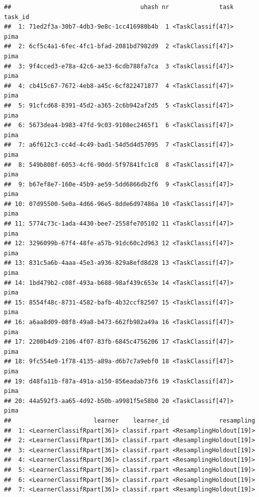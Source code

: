 \documentclass[
]{scrbook}
\newenvironment{Shaded}{\begin{snugshade}}{\end{snugshade}}
\newcommand{\FunctionTok}[1]{\textcolor[rgb]{0.00,0.00,0.00}{#1}}
\newcommand{\NormalTok}[1]{#1}
\newcommand{\SpecialCharTok}[1]{\textcolor[rgb]{0.00,0.00,0.00}{#1}}
\newcommand{\StringTok}[1]{\textcolor[rgb]{0.31,0.60,0.02}{#1}}
\renewenvironment{Shaded} {\begin{snugshade}\small} {\end{snugshade}}
\begin{document}
\begin{Shaded}
\end{Shaded}

\begin{verbatim}
##                                    uhash nr              task task_id
##  1: 71ed2f3a-30b7-4db3-9e8c-1cc416980b4b  1 <TaskClassif[47]>    pima
##  2: 6cf5c4a1-6fec-4fc1-bfad-2081bd7982d9  2 <TaskClassif[47]>    pima
##  3: 9f4cced3-e78a-42c6-ae33-6cdb788fa7ca  3 <TaskClassif[47]>    pima
##  4: cb415c67-7672-4eb8-a45c-6cf822471877  4 <TaskClassif[47]>    pima
##  5: 91cfcd68-8391-45d2-a365-2c6b942af2d5  5 <TaskClassif[47]>    pima
##  6: 5673dea4-b983-47fd-9c03-9108ec2465f1  6 <TaskClassif[47]>    pima
##  7: a6f612c3-cc4d-4c49-bad1-54d5d4d57095  7 <TaskClassif[47]>    pima
##  8: 549b808f-6053-4cf6-90dd-5f97841fc1c8  8 <TaskClassif[47]>    pima
##  9: b67ef8e7-160e-45b9-ae59-5dd6866db2f6  9 <TaskClassif[47]>    pima
## 10: 07d95500-5e0a-4d66-96e5-8dde6d97486a 10 <TaskClassif[47]>    pima
## 11: 5774c73c-1ada-4430-bee7-2558fe705102 11 <TaskClassif[47]>    pima
## 12: 3296099b-67f4-48fe-a57b-91dc60c2d963 12 <TaskClassif[47]>    pima
## 13: 831c5a6b-4aaa-45e3-a936-829a8efd8d28 13 <TaskClassif[47]>    pima
## 14: 1bd479b2-c08f-493a-b688-98af439c653e 14 <TaskClassif[47]>    pima
## 15: 8554f48c-8731-4582-bafb-4b32ccf82507 15 <TaskClassif[47]>    pima
## 16: a6aa8d09-08f8-49a8-b473-662fb982a49a 16 <TaskClassif[47]>    pima
## 17: 2200b4d9-2106-4f07-83fb-6845c4756206 17 <TaskClassif[47]>    pima
## 18: 9fc554e0-1f78-4135-a89a-d6b7c7a9ebf0 18 <TaskClassif[47]>    pima
## 19: d48fa11b-f87a-491a-a150-856eadab73f6 19 <TaskClassif[47]>    pima
## 20: 44a592f3-aa65-4d92-b50b-a9981f5e58b0 20 <TaskClassif[47]>    pima
##                       learner    learner_id              resampling
##  1: <LearnerClassifRpart[36]> classif.rpart <ResamplingHoldout[19]>
##  2: <LearnerClassifRpart[36]> classif.rpart <ResamplingHoldout[19]>
##  3: <LearnerClassifRpart[36]> classif.rpart <ResamplingHoldout[19]>
##  4: <LearnerClassifRpart[36]> classif.rpart <ResamplingHoldout[19]>
##  5: <LearnerClassifRpart[36]> classif.rpart <ResamplingHoldout[19]>
##  6: <LearnerClassifRpart[36]> classif.rpart <ResamplingHoldout[19]>
##  7: <LearnerClassifRpart[36]> classif.rpart <ResamplingHoldout[19]>

\end{verbatim}
\end{document}
